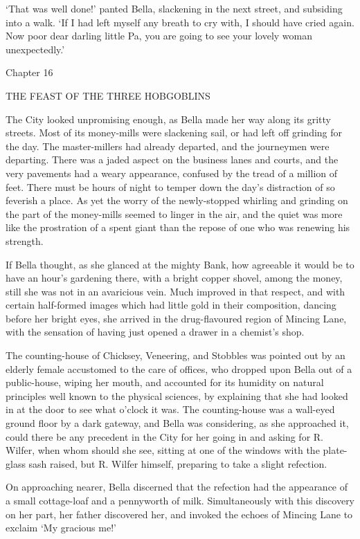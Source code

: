‘That was well done!’ panted Bella, slackening in the next street, and
subsiding into a walk. ‘If I had left myself any breath to cry with, I
should have cried again. Now poor dear darling little Pa, you are going
to see your lovely woman unexpectedly.’



Chapter 16

THE FEAST OF THE THREE HOBGOBLINS


The City looked unpromising enough, as Bella made her way along its
gritty streets. Most of its money-mills were slackening sail, or had
left off grinding for the day. The master-millers had already departed,
and the journeymen were departing. There was a jaded aspect on
the business lanes and courts, and the very pavements had a weary
appearance, confused by the tread of a million of feet. There must be
hours of night to temper down the day’s distraction of so feverish a
place. As yet the worry of the newly-stopped whirling and grinding on
the part of the money-mills seemed to linger in the air, and the quiet
was more like the prostration of a spent giant than the repose of one
who was renewing his strength.

If Bella thought, as she glanced at the mighty Bank, how agreeable it
would be to have an hour’s gardening there, with a bright copper shovel,
among the money, still she was not in an avaricious vein. Much improved
in that respect, and with certain half-formed images which had little
gold in their composition, dancing before her bright eyes, she arrived
in the drug-flavoured region of Mincing Lane, with the sensation of
having just opened a drawer in a chemist’s shop.

The counting-house of Chicksey, Veneering, and Stobbles was pointed out
by an elderly female accustomed to the care of offices, who dropped upon
Bella out of a public-house, wiping her mouth, and accounted for its
humidity on natural principles well known to the physical sciences, by
explaining that she had looked in at the door to see what o’clock it
was. The counting-house was a wall-eyed ground floor by a dark gateway,
and Bella was considering, as she approached it, could there be any
precedent in the City for her going in and asking for R. Wilfer, when
whom should she see, sitting at one of the windows with the plate-glass
sash raised, but R. Wilfer himself, preparing to take a slight
refection.

On approaching nearer, Bella discerned that the refection had
the appearance of a small cottage-loaf and a pennyworth of milk.
Simultaneously with this discovery on her part, her father discovered
her, and invoked the echoes of Mincing Lane to exclaim ‘My gracious me!’

